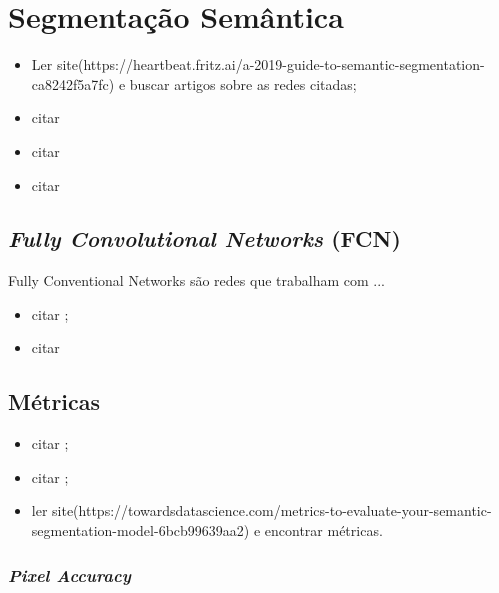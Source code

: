 \newpage
\section{Segmentação Semântica}
\label{semantic:semantic}
\begin{itemize}
    \item Ler site(https://heartbeat.fritz.ai/a-2019-guide-to-semantic-segmentation-ca8242f5a7fc) e buscar artigos sobre as redes citadas;
    \item citar \cite{Minaee2021}
    \item citar \cite{Arbelaez2012}
    \item citar \cite{Zhang2018}
\end{itemize}


\subsection{\textit{Fully Convolutional Networks} (FCN)}
\label{semantic:FCN}
Fully Conventional Networks são redes que trabalham com ... 
\begin{itemize}
    \item citar \cite{Shelhamer2016};
    \item citar \cite{Minaee2021}
\end{itemize}


\subsection{Métricas}
\begin{itemize}
    \item citar \cite{Csurka};
    \item citar \cite{Minaee2021};
    \item ler site(https://towardsdatascience.com/metrics-to-evaluate-your-semantic-segmentation-model-6bcb99639aa2) e encontrar métricas.
\end{itemize}
\subsubsection{\textit{Pixel Accuracy}}
